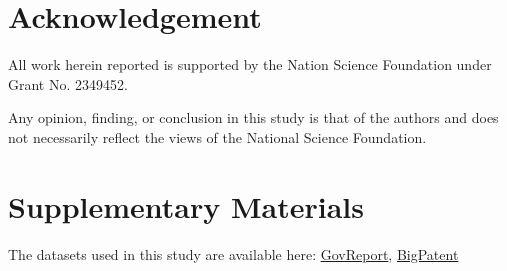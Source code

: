 \section*{Acknowledgement}

	All work herein reported is supported by the Nation Science Foundation under Grant
	No. 2349452.

	Any opinion, finding, or conclusion in this study is that of the authors and does not
	necessarily reflect the views of the National Science Foundation.


\section*{Supplementary Materials}

	The datasets used in this study are available here:
	\href{https://gov-report-data.github.io/}{GovReport},
	\href{https://evasharma.github.io/bigpatent/}{BigPatent}
